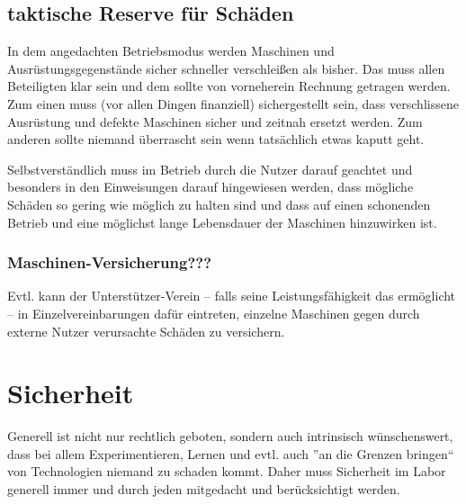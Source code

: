 \documentclass[parskip=half,headsepline,footsepline,titlepage]{scrartcl}
\begin{document}
\subsection{taktische Reserve für Schäden}
In dem angedachten Betriebsmodus werden Maschinen und Ausrüstungsgegenstände sicher schneller verschleißen als bisher. Das muss allen Beteiligten klar sein und dem sollte von vorneherein Rechnung getragen werden.
Zum einen muss (vor allen Dingen finanziell) sichergestellt sein, dass verschlissene Ausrüstung und defekte Maschinen sicher und zeitnah ersetzt werden. Zum anderen sollte niemand überrascht sein wenn tatsächlich etwas kaputt geht.

Selbstverständlich muss im Betrieb durch die Nutzer darauf geachtet und besonders in den Einweisungen darauf hingewiesen werden, dass mögliche Schäden so gering wie möglich zu halten sind und dass auf einen schonenden Betrieb und eine möglichst lange Lebensdauer der Maschinen hinzuwirken ist.


\subsubsection{Maschinen-Versicherung???}
Evtl. kann der Unterstützer-Verein -- falls seine Leistungsfähigkeit das ermöglicht -- in Einzelvereinbarungen dafür eintreten, einzelne Maschinen gegen durch externe Nutzer verursachte Schäden zu versichern.


\section{Sicherheit}
Generell ist nicht nur rechtlich geboten, sondern auch intrinsisch wünschenswert, dass bei allem Experimentieren, Lernen und evtl. auch ''an die Grenzen bringen`` von Technologien niemand zu schaden kommt. Daher muss Sicherheit im Labor generell immer und durch jeden mitgedacht und berücksichtigt werden. 
\end{document}
